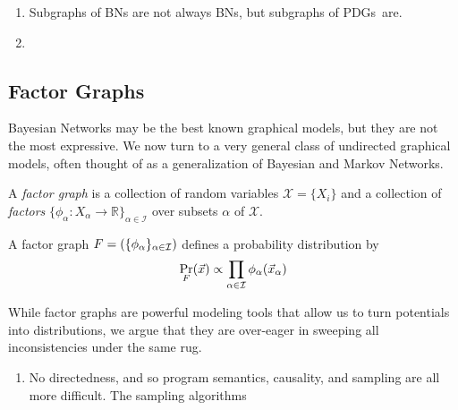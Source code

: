 \documentclass{article}
\newcommand{\MN}{PDG}
\newcommand{\MNs}{\MN s}
\begin{document}
	\begin{fact}
		\begin{enumerate}
			\item Subgraphs of BNs are not always BNs, but subgraphs of \MNs\ are.
			\item 
		\end{enumerate}
	\end{fact}
	
	\subsection{Factor Graphs} \label{sec:factor-graphs}
	
	Bayesian Networks may be the best known graphical models, but they are not the most expressive. We now turn to a very general class of undirected graphical models, often thought of as a generalization of Bayesian and Markov Networks.
	\begin{defn}
		A \emph{factor graph} is a collection of random variables $\mathcal X = \{X_i\}$ and a collection of \emph{factors} $\{\phi_\alpha\colon X_\alpha \to \mathbb R\}_{\alpha \in \mathcal I }$ over subsets $\alpha$ of $\mathcal X$.
	\end{defn}

	A factor graph $F = (\{\phi_\alpha\}_{\alpha \in \cal I})$ defines a probability distribution by 
	\[ \Pr_F(\vec x) \propto \prod_{\alpha \in \cal I} \phi_\alpha(\vec x_{\alpha}) \]

	While factor graphs are powerful modeling tools that allow us to turn potentials into distributions, we argue that they are over-eager in sweeping all inconsistencies under the same rug. 
	\begin{enumerate}
		\item No directedness, and so program semantics, causality, and sampling are all more difficult. The sampling algorithms
	\end{enumerate}
	
\end{document}

